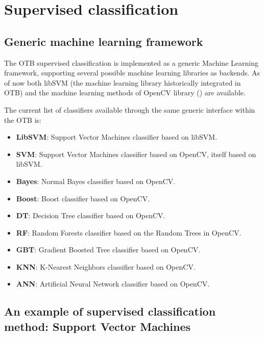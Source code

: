 \ifitkFullVersion

\fi 




\section{Supervised classification}

\subsection{Generic machine learning framework}
\label{sec:MLGenericFramework}

The OTB supervised classification is implemented as a generic Machine Learning 
framework, supporting several possible machine learning libraries as backends.
As of now both libSVM (the machine learning library historically integrated in OTB)
and the machine learning methods of OpenCV library (\cite{opencv_library}) are
available.

The current list of classifiers available through the same generic interface within the OTB is:

\begin{itemize}
  \item \textbf{LibSVM}: Support Vector Machines classifier based on libSVM.
  \item \textbf{SVM}: Support Vector Machines classifier based on OpenCV, itself based on libSVM.
  \item \textbf{Bayes}: Normal Bayes classifier based on OpenCV.
  \item \textbf{Boost}: Boost classifier based on OpenCV.
  \item \textbf{DT}: Decision Tree classifier based on OpenCV.
  \item \textbf{RF}: Random Forests classifier based on the Random Trees in OpenCV.
  \item \textbf{GBT}: Gradient Boosted Tree classifier based on OpenCV.
  \item \textbf{KNN}: K-Nearest Neighbors classifier based on OpenCV.
  \item \textbf{ANN}: Artificial Neural Network classifier based on OpenCV.
\end{itemize}


\subsection{An example of supervised classification method: Support Vector Machines}
\label{sec:SupportVectorMachines}

